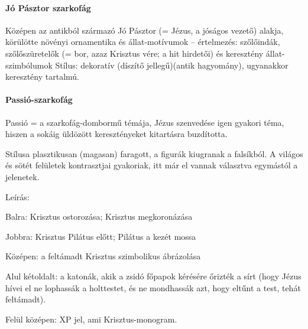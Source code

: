 \vspace{0.5cm}


\paragraph{Jó Pásztor szarkofág}
Középen az antikból származó Jó Pásztor (= Jézus, a jóságos vezető) alakja, körülötte növényi ornamentika és állat-motívumok – értelmezés: szőlőindák, szőlőszüretelők (= bor, azaz Krisztus vére; a hit hirdetői) és keresztény állat-szimbólumok
Stílus: dekoratív (díszítő jellegű)(antik hagyomány), ugyanakkor keresztény tartalmú.

\paragraph{Passió-szarkofág}
Passió = a szarkofág-dombormű témája, Jézus szenvedése igen gyakori téma, hiszen a sokáig üldözött keresztényeket kitartásra buzdította.

Stílusa plasztikusan (magasan) faragott, a figurák kiugranak a falsíkból. A világos és sötét felületek kontrasztjai gyakoriak, itt már el vannak választva egymástól a jelenetek.

Leírás:
	\begin{compactitem}
		\item Balra: Krisztus ostorozása; Krisztus megkoronázása
		\item Jobbra: Krisztus Pilátus előtt; Pilátus a kezét mossa
		\item Középen: a feltámadt Krisztus szimbolikus ábrázolása
		\item Alul kétoldalt: a katonák, akik a zsidó főpapok kérésére őrizték a sírt (hogy Jézus hívei el ne lophassák a holttestet, és ne mondhassák azt, hogy eltűnt a test, tehát feltámadt).
		\item Felül középen: XP jel, ami Krisztus-monogram.
	\end{compactitem}


\clearpage

